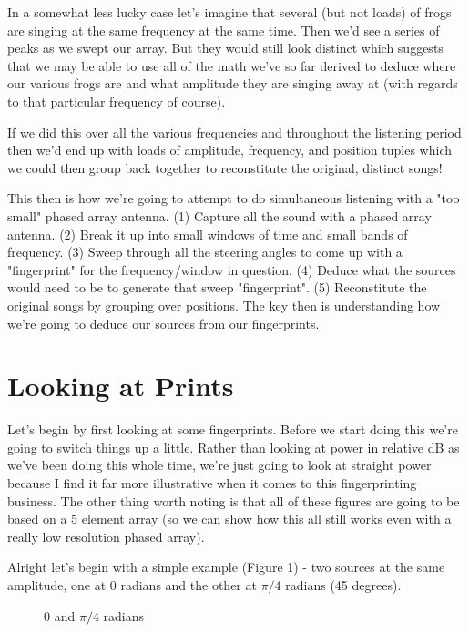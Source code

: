 \documentclass[12pt,a6paper]{book}
\begin{document}
In a somewhat less lucky case let's imagine that several (but not loads) of frogs are singing at the same frequency at the same time. Then we'd see a series of peaks as we swept our array. But they would still look distinct which suggests that we may be able to use all of the math we've so far derived to deduce where our various frogs are and what amplitude they are singing away at (with regards to that particular frequency of course). 

If we did this over all the various frequencies and throughout the listening period then we'd end up with loads of amplitude, frequency, and position tuples which we could then group back together to reconstitute the original, distinct songs! 

This then is how we're going to attempt to do simultaneous listening with a "too small" phased array antenna. (1) Capture all the sound with a phased array antenna. (2) Break it up into small windows of time and small bands of frequency. (3) Sweep through all the steering angles to come up with a "fingerprint" for the frequency/window in question. (4) Deduce what the sources would need to be to generate that sweep "fingerprint". (5) Reconstitute the original songs by grouping over positions. The key then is understanding how we're going to deduce our sources from our fingerprints.

\section{Looking at Prints}
Let's begin by first looking at some fingerprints. Before we start doing this we're going to switch things up a little. Rather than looking at power in relative dB as we've been doing this whole time, we're just going to look at straight power because I find it far more illustrative when it comes to this fingerprinting business. The other thing worth noting is that all of these figures are going to be based on a 5 element array (so we can show how this all still works even with a really low resolution phased array). 

Alright let's begin with a simple example (Figure 1) - two sources at the same amplitude, one at 0 radians and the other at $\pi/4$ radians (45 degrees). 

\begin{figure}[!htb]
\caption{\label{fig:my-label} 0 and $\pi/4$ radians}
\end{figure}
\end{document}
